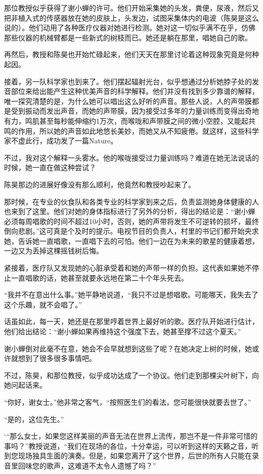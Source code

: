 \documentclass[lang=cn]{elegantpaper}
\begin{document}
那位教授似乎获得了谢小蝉的许可。他们开始采集她的头发，粪便，尿液，然后又把非植入式的传感器放在她的皮肤上，头发边，试图采集体内的电波（陈昊是这么说的）。他们动用了各种医疗仪器对她进行检测。她对这一切似乎满不在乎，仿佛那些仪器的机械臂都是一些新式的树枝而已。她还是躺在那里，唱她自己的歌。

再然后，教授和陈昊也开始忙碌起来，他们天天在那里讨论着这种现象究竟是何种起因。

接着，另一队科学家也到来了。他们摆起辐射光台，似乎想通过分析她脖子处的发音部位来给出能产生这种优美声音的科学解释。他们并没有找到多少靠谱的解释，唯一探究清楚的是，为什么她可以唱出这么好听的声音。那些人说，人的声带膜都是受到振动而发出声音，而她的声带膜，因为接受过多年的力量训练而变得出奇地有力，鸣肌甚至每秒能伸缩约1万次，而喉咙和声带膜之间的微小空腔，又能起共鸣的作用，所以她的声音如此地悠长美妙，而她又从不知疲倦。就这样，这些科学家不虚此行，成功发了一篇Nature。

不过，我对这个解释一头雾水。他的喉咙接受过力量训练吗？难道在她无法说话的时候，她一直在做这种尝试？

陈昊那边的进展好像没有那么顺利，他竟然和教授吵起来了。

那时候，在专业的伙食队和各类专业的科学家到来之后，负责监测她身体健康的人也来到了这里。他们对她的身体指标进行了另外的分析，得出的结论是：“谢小蝉必须每周唱歌的时间不超过10小时，否则，她的声带将发生不可逆转的损坏，最终倒向悲剧。”这可真是个及时的提示。电视节目的负责人，村里的书记们都开始央求她，告诉她一直唱歌，一直唱下去的可怕。他们一边在为未来的歌星的健康着想，一边又为丢掉这棵摇钱树后悔。

紧接着，医疗队又发现她的心脏承受着和她的声带一样的负担。这代表如果她不停止一直唱歌的话，她甚至就要永远地在第二十个年头死去。

“我并不在意出什么事。”她平静地说道，“我只不过是想唱歌。可能哪天，我失去了这个乐趣，就不会唱了。”

话虽如此，每一天，她还是在那里哼着世界上最好听的歌。医疗队开始进行估计，他们给出结论：“谢小蝉如果再维持这个强度下去，她甚至撑不过这个夏天。”

谢小蝉倒对此毫不在意，她会不会早就想到这些了呢？在她决定上树的时候，她或许就想到了很多很多事情吧。

不过，陈昊，和那位教授，似乎成功达成了一个协议。他们走到那棵尖叶树下，向她问起话来。

“你好，谢女士。”他非常之客气，“按照医生们的看法，您可能很快就要去世了。”

“是的，这位先生。”

‘“那么女士，如果您这样美丽的声音无法在世界上流传，那岂不是一件非常可惜的事吗？”教授说道，“我们在现场的各位，十分幸运，可以听到这样的天籁之音，听到您现场独具生面的演奏。但是，如果您离开了这个世界，后世的所有人只能在录音里回味您的歌声，这难道不太令人遗憾了吗？”
\end{document}
